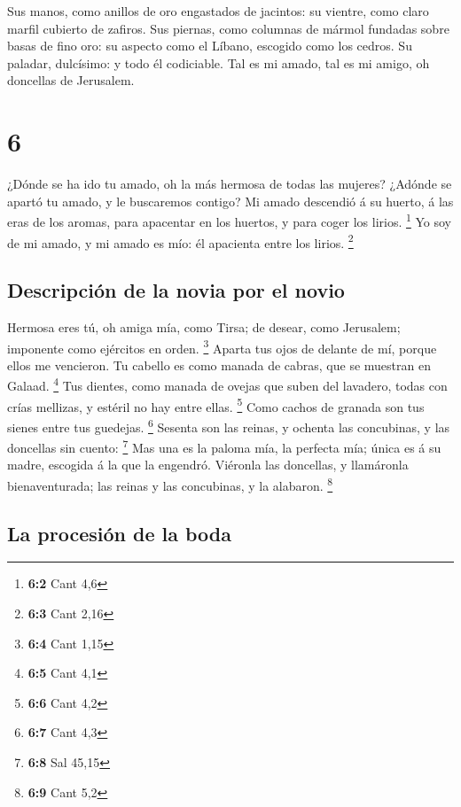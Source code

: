  Sus manos, como anillos de oro engastados de jacintos: su
vientre, como claro marfil cubierto de zafiros.  Sus
piernas, como columnas de mármol fundadas sobre basas de fino oro: su
aspecto como el Líbano, escogido como los cedros.  Su
paladar, dulcísimo: y todo él codiciable. Tal es mi amado, tal es mi
amigo, oh doncellas de Jerusalem.

\hypertarget{section-5}{%
\section{6}\label{section-5}}

 ¿Dónde se ha ido tu amado, oh la más hermosa de todas las
mujeres? ¿Adónde se apartó tu amado, y le buscaremos contigo?
 Mi amado descendió á su huerto, á las eras de los aromas,
para apacentar en los huertos, y para coger los lirios. \footnote{\textbf{6:2}
  Cant 4,6}  Yo soy de mi amado, y mi amado es mío: él
apacienta entre los lirios. \footnote{\textbf{6:3} Cant 2,16}

\hypertarget{descripciuxf3n-de-la-novia-por-el-novio-1}{%
\subsection{Descripción de la novia por el
novio}\label{descripciuxf3n-de-la-novia-por-el-novio-1}}

 Hermosa eres tú, oh amiga mía, como Tirsa; de desear, como
Jerusalem; imponente como ejércitos en orden. \footnote{\textbf{6:4}
  Cant 1,15}  Aparta tus ojos de delante de mí, porque ellos
me vencieron. Tu cabello es como manada de cabras, que se muestran en
Galaad. \footnote{\textbf{6:5} Cant 4,1}  Tus dientes, como
manada de ovejas que suben del lavadero, todas con crías mellizas, y
estéril no hay entre ellas. \footnote{\textbf{6:6} Cant 4,2}
 Como cachos de granada son tus sienes entre tus guedejas.
\footnote{\textbf{6:7} Cant 4,3}  Sesenta son las reinas, y
ochenta las concubinas, y las doncellas sin cuento: \footnote{\textbf{6:8}
  Sal 45,15}  Mas una es la paloma mía, la perfecta mía;
única es á su madre, escogida á la que la engendró. Viéronla las
doncellas, y llamáronla bienaventurada; las reinas y las concubinas, y
la alabaron. \footnote{\textbf{6:9} Cant 5,2}

\hypertarget{la-procesiuxf3n-de-la-boda}{%
\subsection{La procesión de la boda}\label{la-procesiuxf3n-de-la-boda}}

